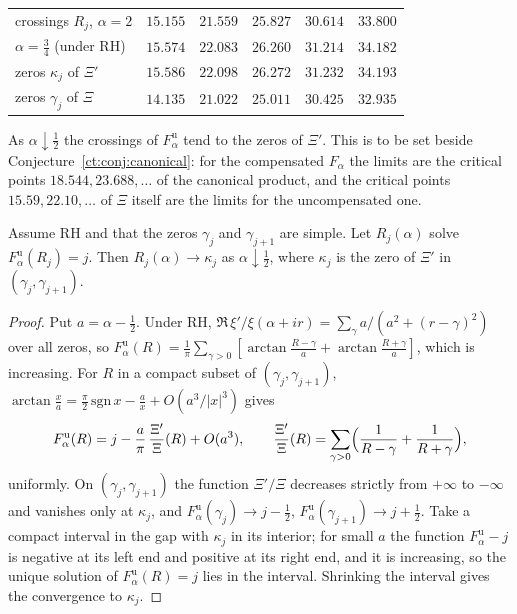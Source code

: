 \begin{center}
\small
\begin{tabular}{lrrrrr}
\toprule
crossings $R_j$, $\alpha=2$ & $15.155$ & $21.559$ & $25.827$ & $30.614$ & $33.800$\\
$\alpha=\frac34$ (under RH) & $15.574$ & $22.083$ & $26.260$ & $31.214$ & $34.182$\\
zeros $\kappa_j$ of $\Xi'$ & $15.586$ & $22.098$ & $26.272$ & $31.232$ & $34.193$\\
zeros $\gamma_j$ of $\Xi$ & $14.135$ & $21.022$ & $25.011$ & $30.425$ & $32.935$\\
\bottomrule
\end{tabular}
\end{center}
As $\alpha\downarrow\frac12$ the crossings of $F^{\mathrm u}_\alpha$ tend to the zeros of $\Xi'$. This is to be set beside Conjecture~\ref{ct:conj:canonical}: for the compensated $F_\alpha$ the limits are the critical points $18.544,23.688,\dots$ of the canonical product, and the critical points $15.59,22.10,\dots$ of $\Xi$ itself are the limits for the uncompensated one.
\begin{theorem}\label{lg:thm:cross}
Assume RH and that the zeros $\gamma_j$ and $\gamma_{j+1}$ are simple. Let $R_j(\alpha)$ solve $F^{\mathrm u}_\alpha(R_j)=j$. Then $R_j(\alpha)\to\kappa_j$ as $\alpha\downarrow\frac12$, where $\kappa_j$ is the zero of $\Xi'$ in $(\gamma_j,\gamma_{j+1})$.
\end{theorem}
\begin{proof}
Put $a=\alpha-\frac12$. Under RH, $\Re\,\xi'/\xi(\alpha+ir)=\sum_\gamma a/(a^2+(r-\gamma)^2)$ over all zeros, so $F^{\mathrm u}_\alpha(R)=\frac1\pi\sum_{\gamma>0}[\arctan\frac{R-\gamma}a+\arctan\frac{R+\gamma}a]$, which is increasing. For $R$ in a compact subset of $(\gamma_j,\gamma_{j+1})$, $\arctan\frac xa=\frac\pi2\,\mathrm{sgn}\,x-\frac ax+O(a^3/|x|^3)$ gives
\[
F^{\mathrm u}_\alpha(R)=j-\frac a\pi\,\frac{\Xi'}{\Xi}(R)+O(a^3),\qquad\frac{\Xi'}{\Xi}(R)=\sum_{\gamma>0}\Bigl(\frac1{R-\gamma}+\frac1{R+\gamma}\Bigr),
\]
uniformly. On $(\gamma_j,\gamma_{j+1})$ the function $\Xi'/\Xi$ decreases strictly from $+\infty$ to $-\infty$ and vanishes only at $\kappa_j$, and $F^{\mathrm u}_\alpha(\gamma_j)\to j-\frac12$, $F^{\mathrm u}_\alpha(\gamma_{j+1})\to j+\frac12$. Take a compact interval in the gap with $\kappa_j$ in its interior; for small $a$ the function $F^{\mathrm u}_\alpha-j$ is negative at its left end and positive at its right end, and it is increasing, so the unique solution of $F^{\mathrm u}_\alpha(R)=j$ lies in the interval. Shrinking the interval gives the convergence to $\kappa_j$.
\end{proof}
